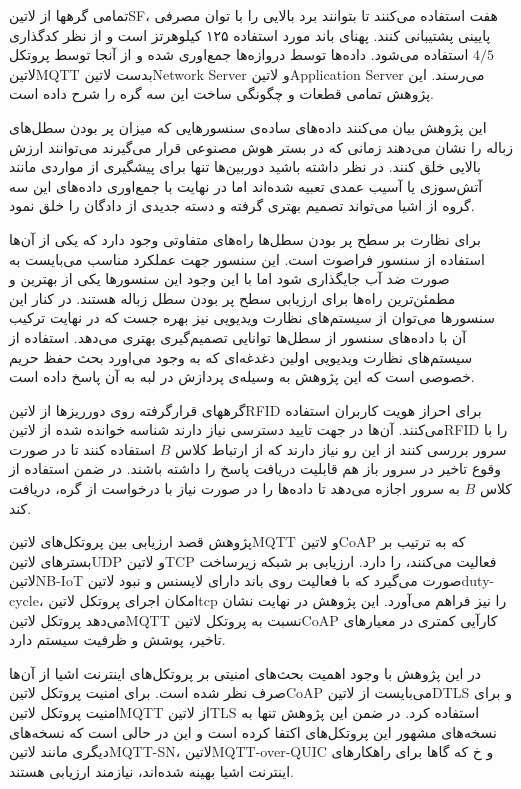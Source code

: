 تمامی گرهها از ‌لاتین{SF}، هفت استفاده می‌کنند تا بتوانند برد بالایی را با توان مصرفی پایینی پشتیبانی کنند. پهنای باند مورد استفاده ۱۲۵ کیلوهرتز است و از نظر کدگذاری $4/5$ استفاده می‌شود.
داده‌ها توسط دروازه‌ها جمع‌اوری شده و از آنجا توسط پروتکل ‌لاتین{MQTT} بدست ‌لاتین{Network Server} و ‌لاتین{Application Server} می‌رسند.
این پژوهش تمامی قطعات و چگونگی ساخت این سه گره را شرح داده است.

این پژوهش بیان می‌کنند داده‌های ساده‌ی سنسورهایی که میزان پر بودن سطل‌های زباله را نشان می‌دهند زمانی که در بستر هوش مصنوعی قرار می‌گیرند می‌توانند ارزش بالایی خلق کنند.
در نظر داشته باشید دوربین‌ها تنها برای پیشگیری از مواردی مانند آتش‌سوزی یا آسیب عمدی تعبیه شده‌اند اما در نهایت با جمع‌اوری داده‌های این سه گروه از اشیا می‌تواند تصمیم بهتری گرفته و دسته جدیدی از دادگان را خلق نمود.

برای نظارت بر سطح پر بودن سطل‌ها راه‌های متفاوتی وجود دارد که یکی از آن‌ها استفاده از سنسور فراصوت است. این سنسور جهت عملکرد مناسب می‌بایست به صورت ضد آب جایگذاری شود اما با این وجود
این سنسورها یکی از بهترین و مطمئن‌ترین راه‌ها برای ارزیابی سطح پر بودن سطل زباله هستند. در کنار این سنسورها می‌توان از سیستم‌های نظارت ویدیویی نیز بهره جست که در نهایت ترکیب آن با داده‌های سنسور
از سطل‌ها توانایی تصمیم‌گیری بهتری می‌دهد. استفاده از سیستم‌های نظارت ویدیویی اولین دغدغه‌ای که به وجود می‌اورد بحث حفظ حریم خصوصی است که این پژوهش به وسیله‌ی پردازش در لبه به آن پاسخ داده است.

گرههای قرارگرفته روی دورریزها از ‌لاتین{RFID} برای احراز هویت کاربران استفاده می‌کنند. آن‌ها در جهت تایید دسترسی نیاز دارند شناسه خوانده شده از ‌لاتین{RFID} را با سرور بررسی کنند
از این رو نیاز دارند که از ارتباط کلاس $B$ استفاده کنند تا در صورت وقوع تاخیر در سرور باز هم قابلیت دریافت پاسخ را داشته باشند. در ضمن استفاده از کلاس $B$ به سرور اجازه می‌دهد تا داده‌ها را
در صورت نیاز با درخواست از گره، دریافت کند.


پژوهش  قصد ارزیابی بین پروتکل‌های ‌لاتین{MQTT} و ‌لاتین{CoAP} که به ترتیب بر بسترهای ‌لاتین{UDP} و ‌لاتین{TCP} فعالیت می‌کنند، را دارد.
ارزیابی بر شبکه زیرساخت ‌لاتین{NB-IoT} صورت می‌گیرد که با فعالیت روی باند دارای لایسنس و نبود ‌لاتین{duty-cycle}، امکان اجرای پروتکل ‌لاتین{tcp} را نیز فراهم می‌آورد.
این پژوهش در نهایت نشان می‌دهد پروتکل ‌لاتین{MQTT} نسبت به پروتکل ‌لاتین{CoAP} کارآیی کمتری در معیارهای تاخیر، پوشش و ظرفیت سیستم دارد.

در این پژوهش با وجود اهمیت بحث‌های امنیتی بر پروتکل‌های اینترنت اشیا از آن‌ها صرف نظر شده است. برای امنیت پروتکل ‌لاتین{CoAP} می‌بایست از ‌لاتین{DTLS} و
برای امنیت پروتکل ‌لاتین{MQTT} از ‌لاتین{TLS} استفاده کرد.
در ضمن این پژوهش تنها به نسخه‌های مشهور این پروتکل‌های اکتفا کرده است و این در حالی است که نسخه‌های دیگری مانند ‌لاتین{MQTT-SN}، ‌لاتین{MQTT-over-QUIC} و ‌خ
که گاها برای راهکارهای اینترنت اشیا بهینه شده‌اند، نیازمند ارزیابی هستند.

